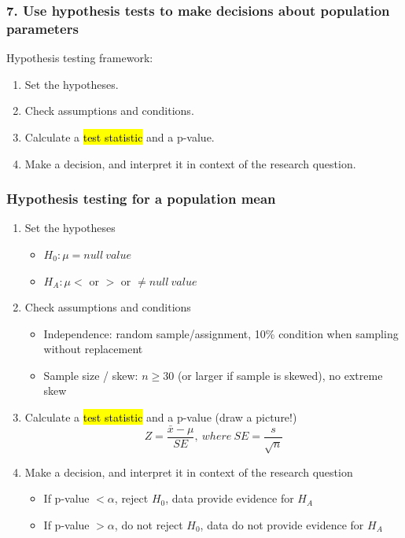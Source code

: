 \documentclass[slidestop,compress,mathserif,12pt,t,professionalfonts,xcolor=table]{beamer}
\begin{document}
\begin{frame}
\frametitle{7. Use hypothesis tests to make decisions about population parameters}

Hypothesis testing framework:

\begin{enumerate}

\item Set the hypotheses.

\item Check assumptions and conditions.

\item Calculate a \hl{test statistic} and a p-value.

\item Make a decision, and interpret it in context of the research question.

\end{enumerate}

\end{frame}


\begin{frame}
\frametitle{Hypothesis testing for a population mean}

\begin{enumerate}

\item Set the hypotheses
\begin{itemize}
\item $H_0: \mu = null~value$
\item $H_A: \mu <$ or $>$ or $\ne null~value$
\end{itemize}

\pause

\item Check assumptions and conditions
\begin{itemize}
\item Independence: random sample/assignment, 10\% condition when sampling without replacement
\item Sample size / skew: $n \ge 30$ (or larger if sample is skewed), no extreme skew
\end{itemize}

\pause

\item Calculate a \hl{test statistic} and a p-value (draw a picture!)
\[ Z = \frac{\bar{x} - \mu}{SE},~where~SE = \frac{s}{\sqrt{n}} \]

\pause

\item Make a decision, and interpret it in context of the research question
\begin{itemize}
\item If p-value $< \alpha$, reject $H_0$, data provide evidence for $H_A$
\item If p-value $> \alpha$, do not reject $H_0$, data do not provide evidence for $H_A$
\end{itemize}

\end{enumerate}

\end{frame}
\end{document}

